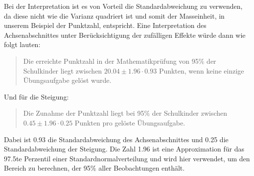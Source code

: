 \documentclass[12pt, a4paper]{article}\usepackage[]{graphicx}\usepackage[]{color}
\begin{document}
Bei der Interpretation ist es von Vorteil die Standardabweichung zu verwenden, da diese nicht wie die Varianz quadriert ist und somit der Masseinheit, in unserem Beispiel der Punktzahl, entspricht. Eine Interpretation des Achsenabschnittes unter Berücksichtigung der zufälligen Effekte würde dann wie folgt lauten: 
\begin{quote}
Die erreichte Punktzahl in der Mathematikprüfung von 95\% der Schulkinder liegt zwischen  $20.04 \pm 1.96 \cdot 0.93$ Punkten, wenn keine einzige Übungsaufgabe gelöst wurde.
\end{quote}
Und für die Steigung:
\begin{quote}
Die Zunahme der Punktzahl liegt bei 95\% der Schulkinder zwischen $0.45 \pm 1.96 \cdot 0.25$ Punkten pro gelöste Übungsaufgabe.
\end{quote}
Dabei ist 0.93 die Standardabweichung des Achsenabschnittes und 0.25 die Standardabweichung der Steigung. Die Zahl 1.96 ist eine Approximation für das 97.5te Perzentil einer Standardnormalverteilung und wird hier verwendet, um den Bereich zu berechnen, der 95\% aller Beobachtungen enthält. 
\end{document}
